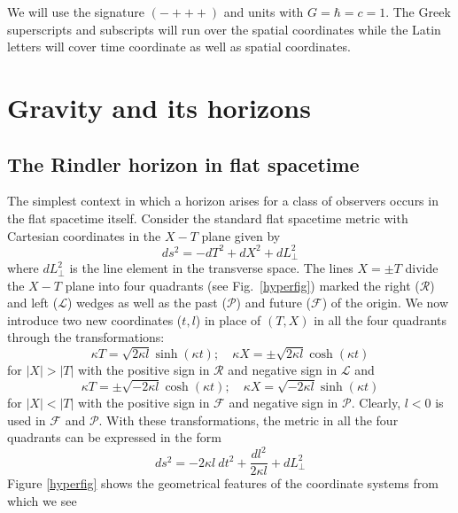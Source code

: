 \documentclass[12pt]{iopart}
\def\fig#1{{Fig.~\ref{#1}}}
\begin{document}
We will use the signature $(- +++)$ and units with $G=\hbar=c=1$. The Greek superscripts and subscripts will run over the spatial coordinates while the Latin letters will cover time coordinate as well as spatial coordinates.

\section{Gravity and its horizons}\label{sec:gravhorizon}

\subsection{The Rindler horizon in flat spacetime}


The simplest context in which a horizon arises for a class of observers occurs in the flat spacetime itself. Consider the standard flat spacetime metric with Cartesian coordinates in the $X-T$ plane given by 
\begin{equation}
 ds^2 = -dT^2 + dX^2 + dL_\perp^2
\end{equation} 
where $dL_\perp^2$ is the line element in the transverse space.
The lines $X=\pm T$ divide the $X-T$ plane into four quadrants (see \fig{hyperfig})
marked the right ($\mathcal{R}$) and left ($\mathcal{L}$) wedges  as well as
the past ($\mathcal{P}$) and future ($\mathcal{F}$) of the origin. We now introduce two new coordinates ($t,l$) in place of $(T,X)$ in all the four quadrants through the transformations:
   \begin{equation}
   \kappa T=\sqrt{2\kappa l} \sinh (\kappa t); \quad \kappa X=\pm \sqrt{2\kappa l} \cosh (\kappa t)
   \label{expone}
   \end{equation}
   for $|X|>|T|$ with the positive sign in $\mathcal{R}$ and negative sign in 
   $\mathcal{L}$ and 
 \begin{equation}
   \kappa T=\pm \sqrt{-2\kappa l} \cosh (\kappa t); \quad \kappa X= \sqrt{-2\kappa l} \sinh (\kappa t)
   \label{exptwo}
   \end{equation}
   for $|X|<|T|$ with the positive sign in $\mathcal{F}$ and negative sign in 
   $\mathcal{P}$.
   Clearly, $l<0$ is used in $\mathcal{F}$ and  $\mathcal{P}$.
   With these transformations, the metric in all the four quadrants can be expressed in the form
   \begin{equation}
   ds^2 = - 2 \kappa l \ dt^2 + \frac{dl^2}{2\kappa l}  + dL_\perp^2
   \label{standardhorizon}
   \end{equation}
   Figure \ref{hyperfig} shows the geometrical features of the coordinate systems from which we see
\end{document}
